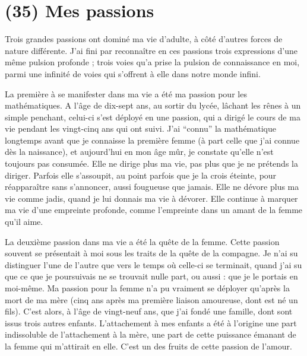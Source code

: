 \section{(35) Mes passions}

Trois grandes passions ont dominé ma vie d'adulte, à côté d'autres forces de nature différente. J'ai fini par reconnaître en ces passions trois expressions d'une même pulsion profonde ; trois voies qu'a prise la pulsion de connaissance en moi, parmi une infinité de voies qui s'offrent à elle dans notre monde infini.

La première à se manifester dans ma vie a été ma passion pour les mathématiques. A l'âge de dix-sept ans, au sortir du lycée, lâchant les rênes à un simple penchant, celui-ci s'est déployé en une passion, qui a dirigé le cours de ma vie pendant les vingt-cinq ans qui ont suivi. J'ai ``connu'' la mathématique longtemps avant que je connaisse la première femme (à part celle que j'ai connue dès la naissance), et aujourd'hui en mon âge mûr, je constate qu'elle n'est toujours pas consumée. Elle ne dirige plus ma vie, pas plus que je ne prétends la diriger. Parfois elle s'assoupit, au point parfois que je la crois éteinte, pour réapparaître sans s'annoncer, aussi fougueuse que jamais. Elle ne dévore plus ma vie comme jadis, quand je lui donnais ma vie à dévorer. Elle continue à marquer ma vie d'une empreinte profonde, comme l'empreinte dans un amant de la femme qu'il aime.

La deuxième passion dans ma vie a été la quête de la femme. Cette passion souvent se présentait à moi sous les traits de la quête de la compagne. Je n'ai su distinguer l'une de l'autre que vers le temps où celle-ci se terminait, quand j'ai su que ce que je poursuivais ne se trouvait nulle part, ou aussi : que je le portais en moi-même. Ma passion pour la femme n'a pu vraiment se déployer qu'après la mort de ma mère (cinq ans après ma première liaison amoureuse, dont est né un fils). C'est alors, à l'âge de vingt-neuf ans, que j'ai fondé une famille, dont sont issus trois autres enfants. L'attachement à mes enfants a été à l'origine une part indissoluble de l'attachement à la mère, une part de cette puissance émanant de la femme qui m'attirait en elle. C'est un des fruits de cette passion de l'amour.

